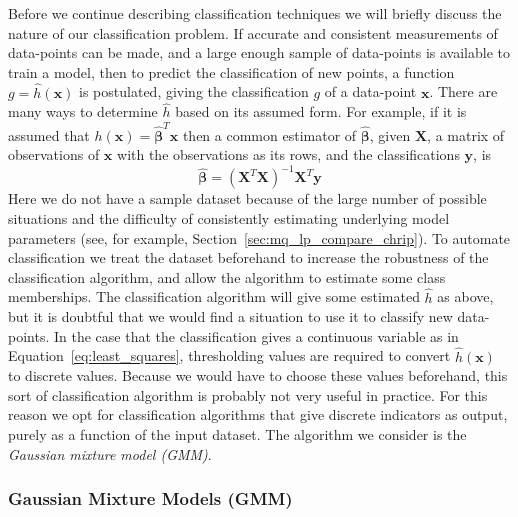 \documentclass[letterpaper,12pt]{report}
\begin{document}
Before we continue describing classification techniques we will briefly discuss
the nature of our classification problem. If accurate and consistent
measurements of data-points can be made, and a large enough sample of
data-points is available to train a model, then to predict the classification of
new points, a function $g=\hat{h} \left( \boldsymbol{x} \right)$ is postulated,
giving the classification $g$ of a data-point $\boldsymbol{x}$. There are many
ways to determine $\hat{h}$ based on its assumed form. For example, if it is
assumed that $h \left( \boldsymbol{x} \right) =
\boldsymbol{\hat{\beta}}^{T}\boldsymbol{x}$ then a common estimator of
$\boldsymbol{\hat{\beta}}$, given $\boldsymbol{X}$, a matrix of observations of
$\boldsymbol{x}$ with the observations as its rows, and the classifications
$\boldsymbol{y}$, is \cite[p.~12]{friedman2001elements}
\begin{equation}
    \label{eq:least_squares}
    \boldsymbol{\hat{\beta}} = \left( \boldsymbol{X}^{T}\boldsymbol{X}
    \right)^{-1} \boldsymbol{X}^{T} \boldsymbol{y}
\end{equation}
Here we do not have a sample dataset because of the large number of possible
situations and the difficulty of consistently estimating underlying model
parameters (see, for example, Section~\ref{sec:mq_lp_compare_chrip}). To automate
classification we treat the dataset beforehand to increase the robustness of the
classification algorithm, and allow the algorithm to estimate some
class memberships. The classification algorithm will give some estimated $\hat{h}$
as above, but it is doubtful that we would find a situation to use it to
classify new data-points. In the case that the classification gives a continuous
variable as in Equation~\ref{eq:least_squares}, thresholding values are
required to convert $\hat{h} \left( \boldsymbol{x} \right)$ to discrete values.
Because we would have to choose these values beforehand, this sort of
classification algorithm is probably not very useful in practice. For this
reason we opt for classification algorithms that give discrete indicators as
output, purely as a function of the input dataset. The algorithm we consider is the
\textit{Gaussian mixture model (GMM)}.

\subsubsection{Gaussian Mixture Models (GMM)}
\end{document}
